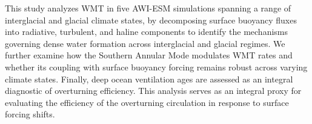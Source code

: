 \documentclass[pdflatex,sn-nature]{sn-jnl}
\begin{document}






This study analyzes WMT in five AWI-ESM simulations spanning a range of interglacial and glacial climate states, by decomposing surface buoyancy fluxes into radiative, turbulent, and haline components to identify the mechanisms governing dense water formation across interglacial and glacial regimes. We further examine how the Southern Annular Mode  modulates WMT rates and whether its coupling with surface buoyancy forcing remains robust across varying climate states. Finally, deep ocean ventilation ages are assessed as an integral diagnostic of overturning efficiency. This analysis serves as  an integral proxy for evaluating the efficiency of the overturning circulation in response to surface forcing shifts.

\end{document}

